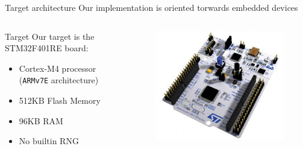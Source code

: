 \begin{frame}{Target architecture}
    Our implementation is oriented torwards embedded devices
    \begin{columns}
        \begin{column}{0.45\linewidth}
            \begin{block}{Target}
                Our target is the STM32F401RE board:
                \begin{itemize}
                    \item Cortex-M4 processor (\texttt{ARMv7E} architecture)
                    \item 512KB Flash Memory
                    \item 96KB RAM
                    \item No builtin RNG
                \end{itemize}
            \end{block}
        \end{column}
        \begin{column}{0.45\linewidth}
            \begin{figure}
                \includegraphics[scale=0.5]{images/stm32board.jpg}
            \end{figure}
        \end{column}
    \end{columns}   
\end{frame}


